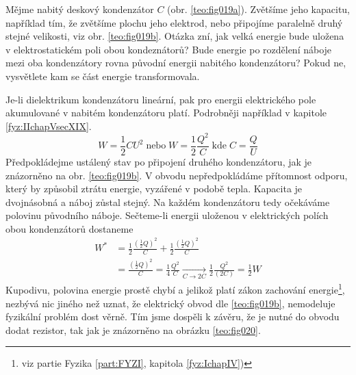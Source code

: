 \begin{mdframed}[style=mdexam]
  \begin{example}\label{teo:exam019}
    Mějme nabitý deskový kondenzátor \(C\) (obr. \ref{teo:fig019a}). Zvětšíme jeho kapacitu,
    například tím, že zvětšíme plochu jeho elektrod, nebo připojíme paralelně druhý stejné
    velikosti, viz obr. \ref{teo:fig019b}. Otázka zní, jak velká energie bude uložena v
    elektrostatickém poli obou kondeznátorů? Bude energie po rozdělení náboje mezi oba kondenzátory
    rovna původní energii nabitého kondenzátoru? Pokud ne, vysvětlete kam se část energie
    transformovala. 
    
    {\centering
      \captionsetup{type=figure}
      \hspace{1em}
      \hspace{1em}
      \label{teo:fig019}
    \par}
    
    Je-li dielektrikum kondenzátoru lineární, pak pro energii elektrického pole akumulované v
    nabitém kondenzátoru platí. Podrobněji například v kapitole \ref{fyz:IIchapVsecXIX}.
    \begin{equation}
      W = \frac{1}{2}CU^2 \;\text{nebo}\; W = \frac{1}{2}\frac{Q^2}{C} \;\text{kde}\; 
      C = \frac{Q}{U}
    \end{equation}
    Předpokládejme ustálený stav po připojení druhého kondenzátoru, jak je znázorněno na obr.
    \ref{teo:fig019b}. V obvodu nepředpokládáme přítomnost odporu, který by způsobil ztrátu energie,
    vyzářené v podobě tepla. Kapacita je dvojnásobná a náboj zůstal stejný. Na každém kondenzátoru
    tedy očekáváme polovinu původního náboje. Sečteme-li energii uloženou v elektrických polích obou
    kondenzátorů dostaneme
    \begin{align*}
      W^* &= \frac{1}{2}\frac{(\frac{1}{2}Q)^2}{C} + \frac{1}{2}\frac{(\frac{1}{2}Q)^2}{C}   \\
          &= \frac{(\frac{1}{2}Q)^2}{C} =\frac{1}{4}\frac{Q^2}{C}                 
           \xrightarrow[C\rightarrow2C]{}
            \frac{1}{2}\frac{Q^2}{(2C)} = \frac{1}{2}W 
    \end{align*}
    Kupodivu, polovina energie prostě chybí a jelikož platí zákon zachování energie\footnote{viz
    partie Fyzika \ref{part:FYZI}, kapitola \ref{fyz:IchapIV})}, nezbývá nic jiného než uznat, že
    elektrický obvod dle \ref{teo:fig019b}, nemodeluje fyzikální problém dost věrně. Tím jsme
    dospěli k závěru, že je nutné do obvodu dodat rezistor, tak jak je znázorněno na obrázku
    \ref{teo:fig020}.
    

\end{example}
\end{mdframed}
